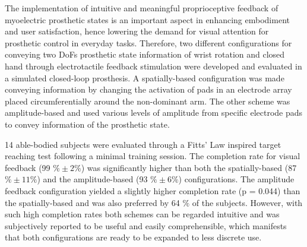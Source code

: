 The implementation of intuitive and meaningful proprioceptive feedback of myoelectric prosthetic states is an important aspect in enhancing embodiment and user satisfaction, hence lowering the demand for visual attention for prosthetic control in everyday tasks. Therefore, two different configurations for conveying two DoFs prosthetic state information of wrist rotation and closed hand through electrotactile feedback stimulation were developed and evaluated in a simulated closed-loop prosthesis. A spatially-based configuration was made conveying information by changing the activation of pads in an electrode array placed circumferentially around the non-dominant arm. The other scheme was amplitude-based and used various levels of amplitude from specific electrode pads to convey information of the prosthetic state. 

14 able-bodied subjects were evaluated through a Fitts' Law inspired target reaching test following a minimal training session. The completion rate for visual feedback (99 $\% \pm 2\%$) was significantly higher than both the spatially-based (87 $\% \pm 11 \%$) and the amplitude-based (93 $\% \pm 6\%$) configurations. The amplitude feedback configuration yielded a slightly higher completion rate (p = 0.044) than the spatially-based and was also preferred by 64 $\%$ of the subjects. However, with such high completion rates both schemes can be regarded intuitive and was subjectively reported to be useful and easily comprehensible, which manifests that both configurations are ready to be expanded to less discrete use.    
